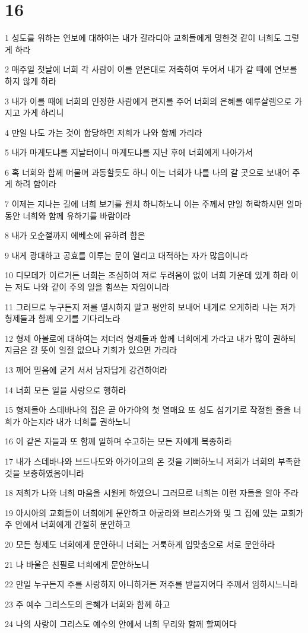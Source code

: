 \chapter{16}

\par 1 성도를 위하는 연보에 대하여는 내가 갈라디아 교회들에게 명한것 같이 너희도 그렇게 하라
\par 2 매주일 첫날에 너희 각 사람이 이를 얻은대로 저축하여 두어서 내가 갈 때에 연보를 하지 않게 하라
\par 3 내가 이를 때에 너희의 인정한 사람에게 편지를 주어 너희의 은혜를 예루살렘으로 가지고 가게 하리니
\par 4 만일 나도 가는 것이 합당하면 저희가 나와 함께 가리라
\par 5 내가 마게도냐를 지날터이니 마게도냐를 지난 후에 너희에게 나아가서
\par 6 혹 너희와 함께 머물며 과동할듯도 하니 이는 너희가 나를 나의 갈 곳으로 보내어 주게 하려 함이라
\par 7 이제는 지나는 길에 너희 보기를 원치 하니하노니 이는 주께서 만일 허락하시면 얼마 동안 너희와 함께 유하기를 바람이라
\par 8 내가 오순절까지 에베소에 유하려 함은
\par 9 내게 광대하고 공효를 이루는 문이 열리고 대적하는 자가 많음이니라
\par 10 디모데가 이르거든 너희는 조심하여 저로 두려움이 없이 너희 가운데 있게 하라 이는 저도 나와 같이 주의 일을 힘쓰는 자임이니라
\par 11 그러므로 누구든지 저를 멸시하지 말고 평안히 보내어 내게로 오게하라 나는 저가 형제들과 함께 오기를 기다리노라
\par 12 형제 아볼로에 대하여는 저더러 형제들과 함께 너희에게 가라고 내가 많이 권하되 지금은 갈 뜻이 일절 없으나 기회가 있으면 가리라
\par 13 깨어 믿음에 굳게 서서 남자답게 강건하여라
\par 14 너희 모든 일을 사랑으로 행하라
\par 15 형제들아 스데바나의 집은 곧 아가야의 첫 열매요 또 성도 섬기기로 작정한 줄을 너희가 아는지라 내가 너희를 권하노니
\par 16 이 같은 자들과 또 함께 일하며 수고하는 모든 자에게 복종하라
\par 17 내가 스데바나와 브드나도와 아가이고의 온 것을 기뻐하노니 저희가 너희의 부족한 것을 보충하였음이니라
\par 18 저희가 나와 너희 마음을 시원케 하였으니 그러므로 너희는 이런 자들을 알아 주라
\par 19 아시아의 교회들이 너희에게 문안하고 아굴라와 브리스가와 및 그 집에 있는 교회가 주 안에서 너희에게 간절히 문안하고
\par 20 모든 형제도 너희에게 문안하니 너희는 거룩하게 입맞춤으로 서로 문안하라
\par 21 나 바울은 친필로 너희에게 문안하노니
\par 22 만일 누구든지 주를 사랑하지 아니하거든 저주를 받을지어다 주께서 임하시느니라
\par 23 주 예수 그리스도의 은혜가 너희와 함께 하고
\par 24 나의 사랑이 그리스도 예수의 안에서 너희 무리와 함께 할찌어다



